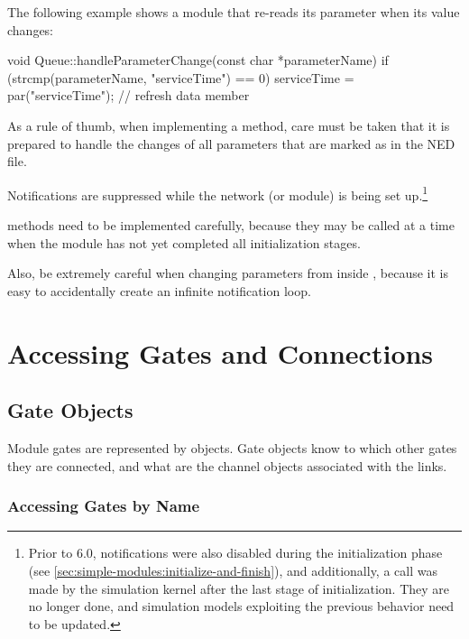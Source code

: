 \begin{ned}
The following example shows a module that re-reads
its  parameter when its value changes:

\begin{cpp}
void Queue::handleParameterChange(const char *parameterName)
{
    if (strcmp(parameterName, "serviceTime") == 0)
        serviceTime = par("serviceTime"); // refresh data member
}
\end{cpp}

\begin{note}
  As a rule of thumb, when implementing a 
  method, care must be taken that it is prepared to handle the changes of all
  parameters that are marked as  in the NED file.
\end{note}

Notifications are suppressed while the network (or module) is being set
up.\footnote{ Prior to {\opp} 6.0, notifications were also disabled during the
initialization phase (see \ref{sec:simple-modules:initialize-and-finish}), and
additionally, a  call was made by the
simulation kernel after the last stage of initialization. They are no longer
done, and simulation models exploiting the previous behavior need to be
updated.}

 methods need to be implemented carefully,
because they may be called at a time when the module has not yet completed all
initialization stages.

Also, be extremely careful when changing parameters from inside
, because it is easy to accidentally
create an infinite notification loop.


\section{Accessing Gates and Connections}
\label{sec:simple-modules:gates}

\subsection{Gate Objects}
\label{sec:simple-modules:gate-objects}

Module gates are represented by  objects.
Gate objects know to which other gates they are connected, and
what are the channel objects associated with the links.

\subsubsection{Accessing Gates by Name}
\label{sec:simple-modules:accessing-gates-by-name}


\end{ned}
